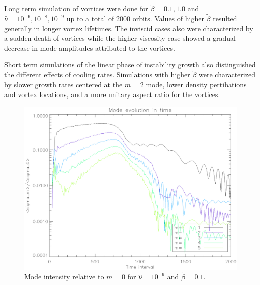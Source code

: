 Long term simulation of vortices were done for $\tilde{\beta}=0.1,1.0$ and
 $\hat{\nu}=10^{-6},10^{-8},10^{-9}$ up to a total of 2000 orbits. Values
 of higher $\tilde{\beta}$ resulted generally in longer vortex lifetimes.
 The inviscid cases also were characterized by a sudden death of vortices
 while the higher viscosity case showed a gradual decrease in mode amplitudes
 attributed to the vortices.

Short term simulations of the linear phase of instability growth also distinguished
 the different effects of cooling rates. Simulations with higher
 $\tilde{\beta}$ were characterized by slower growth rates centered at the
 $m=2$ mode, lower density pertibations and vortex locations, and a more unitary aspect
 ratio for the vortices.

 \begin{figure}
   \includegraphics[scale=.42]{figures/stability_vis9betalow.ps}
   \caption{Mode intensity relative to $m=0$ for $\hat{\nu}=10^{-9}$ and $\tilde{\beta}=0.1$.}
 \label{stability_vis9lowb}
 \end{figure}

